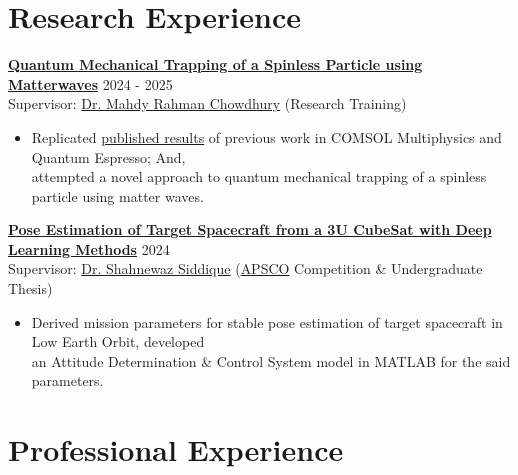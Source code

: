 \documentclass[11pt,a4paper]{article}
\newcommand{\researchexperienceitem}[3]{
  \textbf{#1} \hfill {\footnotesize{#3}} \\
  #2
}
\begin{document}
\section*{Research Experience}

  
  \researchexperienceitem{{\href{https://www.canva.com/design/DAGHtj4JSEY/mIrDE-2Q_oaq9_5ZdW7QPQ/view?utm_content=DAGHtj4JSEY&utm_campaign=designshare&utm_medium=link2&utm_source=uniquelinks&utlId=h0feed87812}{Quantum Mechanical Trapping of a Spinless Particle using Matterwaves}}}{Supervisor: {\href{https://scholar.google.com/citations?user=PxNOguMAAAAJ&hl=en}{Dr. Mahdy Rahman Chowdhury}} (Research Training)}{2024 - 2025}
  \begin{itemize}
    \item Replicated {\href{https://www.sciencedirect.com/science/article/pii/S2405844023106578}{published results}} of previous work in COMSOL Multiphysics and Quantum Espresso; And, \\attempted a novel approach to quantum mechanical trapping of a spinless particle using matter waves.
  \end{itemize}
\researchexperienceitem{{\href{https://drive.google.com/file/d/1jmDFps1sxxSo2bpzIJzQsx7QF3koQ-rs/view}{Pose Estimation of Target Spacecraft from a 3U CubeSat with Deep Learning Methods}}}{Supervisor: {\href{https://scholar.google.com/citations?hl=en&user=6XLqr5QAAAAJ}{Dr. Shahnewaz Siddique}} ({\href{http://www.apsco.int}{APSCO}} Competition \& Undergraduate Thesis)}{2024}
  \begin{itemize}
    \item Derived mission parameters for stable pose estimation of target spacecraft in Low Earth Orbit, developed \\ an Attitude Determination \& Control System model in MATLAB for the said parameters.
  \end{itemize}
  

\section*{Professional Experience}
\end{document}
